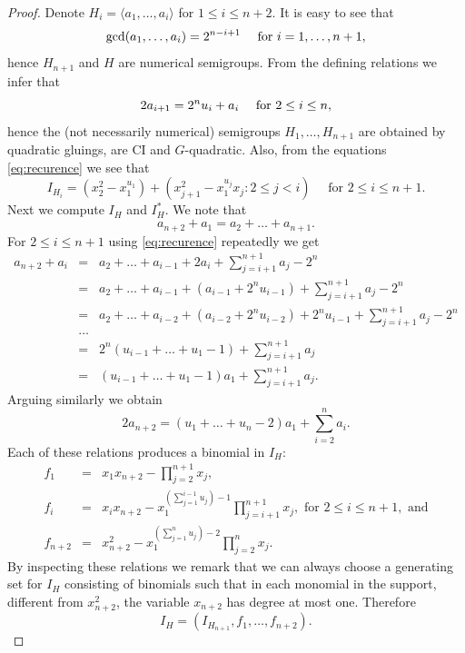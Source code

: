 \documentclass[12pt]{amsart}
\begin{document}
 
\begin{proof}
Denote $H_i=\langle a_1,\dots, a_i \rangle$ for $1\leq i \leq n+2$. It is easy to see that 
$$
\gcd(a_1,\dots, a_i)=2^{n-i+1} \text{ \quad for }i=1,\dots, n+1,
$$ 
hence $H_{n+1}$ and $H$ are  numerical semigroups.
From the defining relations we infer that 
\begin{equation}
\label{eq:recurence}
2a_{i+1}= 2^n u_i+ a_i \text{ \quad for } 2\leq i \leq n,
\end{equation}
hence the (not necessarily numerical) semigroups $H_1, \dots, H_{n+1}$ are obtained by quadratic gluings, 
are CI and $G$-quadratic.
Also, from the equations \eqref{eq:recurence} we see that 
$$
I_{H_i}= (x_2^2-x_1^{u_1})+(x_{j+1}^2-x_1^{u_j}x_j: 2\leq j <i) \quad \text{ for } 2\leq i \leq n+1.
$$ 
Next we compute $I_H$ and $I_H^*$. We note that
$$
a_{n+2}+ a_1= a_2+\dots + a_{n+1}.
$$
For $2\leq i \leq n+1$  using \eqref{eq:recurence} repeatedly we get  
\begin{eqnarray*}
a_{n+2}+ a_i &=& a_2+\dots + a_{i-1} + 2a_i + \sum_{j=i+1}^{n+1}a_j -2^n \\
	           &=& a_2+\dots + a_{i-1} +( a_{i-1} + 2^n u_{i-1} )+ \sum_{j=i+1}^{n+1}a_j  -2^n\\
						 &=& a_2+\dots + a_{i-2}+ (a_{i-2}+ 2^n u_{i-2}) + 2^n u_{i-1} + \sum_{j=i+1}^{n+1}a_j-2^n\\ 
						&\dots& \\
						 &=& 2^n(u_{i-1}+\dots +u_1 -1) + \sum_{j=i+1}^{n+1}a_j \\
						 &=& (u_{i-1}+\dots + u_1 -1) a_1 + \sum_{j=i+1}^{n+1}a_j.
\end{eqnarray*}
Arguing similarly we obtain
$$
2 a_{n+2}=  (u_1+\dots + u_n -2)a_1 +\sum_{i=2}^{n}a_i.
$$
Each of these relations produces a binomial in $I_H$:
\begin{eqnarray*}
f_1     &=& x_1 x_{n+2}- \prod_{j=2}^{n+1}x_j, \\ 
f_i     &=& x_i x_{n+2}- x_1^{(\sum_{j=1}^{i-1}u_j) -1} \prod_{j=i+1}^{n+1} x_j, \text{ for } 2\leq i \leq n+1, \text{ and} \\
f_{n+2} &=& x_{n+2}^2- x_1^{(\sum_{j=1}^n u_j)-2} \prod_{j=2}^n x_j.
\end{eqnarray*}
By inspecting these relations we remark that we can always choose a  generating set for $I_H$ consisting of binomials
such that in each monomial in the support, different from $x_{n+2}^2$, the variable  $x_{n+2}$ has degree at most one.
Therefore 
$$
I_H= (I_{H_{n+1}}, f_1, \dots, f_{n+2}).
$$


\end{proof}
\end{document}
